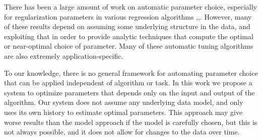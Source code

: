 There has been a large amount of work on automatic parameter choice, 
especially for regularization parameters in various regression algorithms 
\cite{CI12},\cite{GEE10},\cite{BBGH07}. However, many of these results depend on assuming some 
underlying structure in the data, and exploiting that in order to provide 
analytic techniques that compute the optimal or near-optimal choice of 
parameter. Many of these automatic tuning algorithms are also extremely 
application-specific. 

To our knowledge, there is no general framework for automating parameter 
choice that can be applied independent of algorithm or task. In this work 
we propose a system to optimize parameters that depends only on the input 
and output of the algorithm. Our system does not assume any underlying 
data model, and only uses its own history to estimate optimal parameters. 
This approach may give worse results than the model approach if the model 
is carefully chosen, but this is not always possible, and it does not
allow for changes to the data over time.